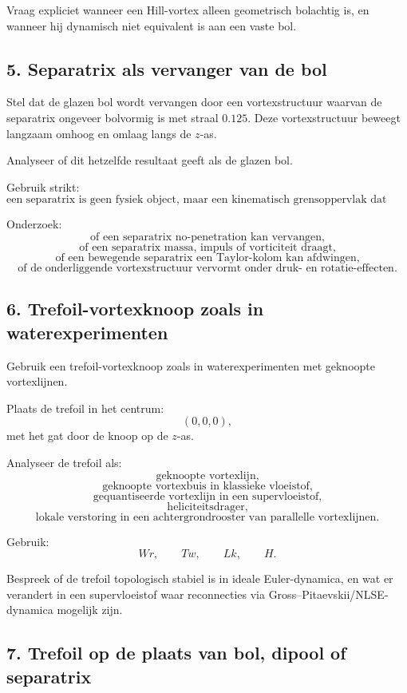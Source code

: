 \documentclass[11pt,a4paper]{article}
\begin{document}
Vraag expliciet wanneer een Hill-vortex alleen geometrisch bolachtig is, en wanneer hij dynamisch niet equivalent is aan een vaste bol.

\subsection{5. Separatrix als vervanger van de bol}

Stel dat de glazen bol wordt vervangen door een vortexstructuur waarvan de separatrix ongeveer bolvormig is met straal \(0.125\). Deze vortexstructuur beweegt langzaam omhoog en omlaag langs de \(z\)-as.

Analyseer of dit hetzelfde resultaat geeft als de glazen bol.

Gebruik strikt:
\[
\text{een separatrix is geen fysiek object, maar een kinematisch grensoppervlak dat volgt uit de stroming.}
\]

Onderzoek:
\[
\text{of een separatrix no-penetration kan vervangen,}
\]
\[
\text{of een separatrix massa, impuls of vorticiteit draagt,}
\]
\[
\text{of een bewegende separatrix een Taylor-kolom kan afdwingen,}
\]
\[
\text{of de onderliggende vortexstructuur vervormt onder druk- en rotatie-effecten.}
\]

\subsection{6. Trefoil-vortexknoop zoals in waterexperimenten}

Gebruik een trefoil-vortexknoop zoals in waterexperimenten met geknoopte vortexlijnen.

Plaats de trefoil in het centrum:
\[
(0,0,0),
\]
met het gat door de knoop op de \(z\)-as.

Analyseer de trefoil als:
\[
\text{geknoopte vortexlijn,}
\]
\[
\text{geknoopte vortexbuis in klassieke vloeistof,}
\]
\[
\text{gequantiseerde vortexlijn in een supervloeistof,}
\]
\[
\text{heliciteitsdrager,}
\]
\[
\text{lokale verstoring in een achtergrondrooster van parallelle vortexlijnen.}
\]

Gebruik:
\[
Wr,
\qquad
Tw,
\qquad
Lk,
\qquad
H.
\]

Bespreek of de trefoil topologisch stabiel is in ideale Euler-dynamica, en wat er verandert in een supervloeistof waar reconnecties via Gross--Pitaevskii/NLSE-dynamica mogelijk zijn.

\subsection{7. Trefoil op de plaats van bol, dipool of separatrix}
\end{document}
